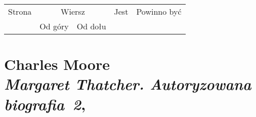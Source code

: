 \documentclass[a4paper,11pt]{article}
\numberwithin{equation}{section}
\begin{document}


\begin{center}

  \begin{tabular}{|c|c|c|c|c|}
    \hline
    Strona & \multicolumn{2}{c|}{Wiersz} & Jest
                              & Powinno być \\ \cline{2-3}
    & Od góry & Od dołu & & \\
    \hline
    \hline
  \end{tabular}

\end{center}

\VerSpaceTwo












\newpage

\section{ %
  Charles Moore \\
  \textit{Margaret Thatcher. Autoryzowana biografia~2},
  \cite{MooreMargaretThatcherPLVolII2019}}

\vspace{0em}
\end{document}
